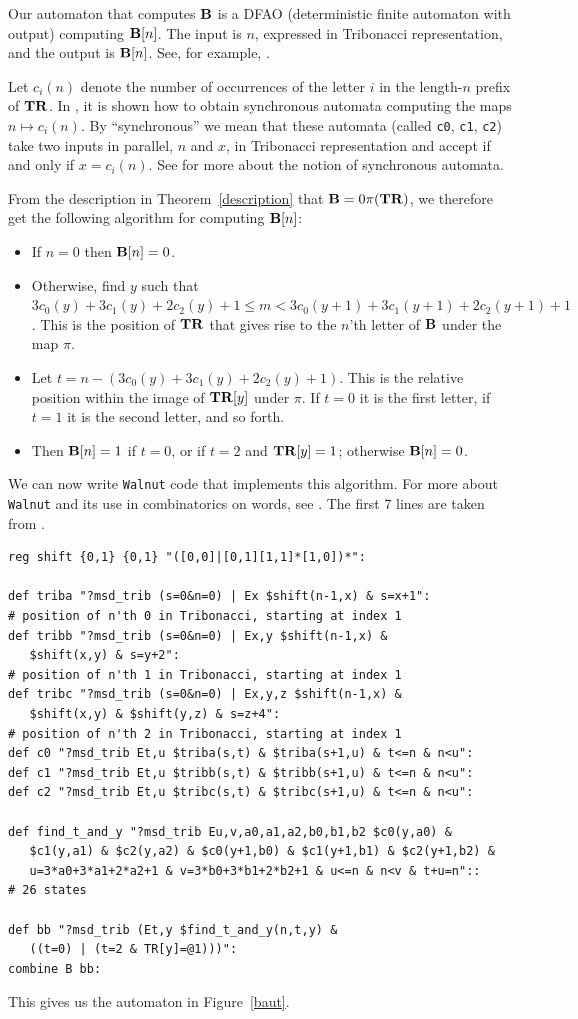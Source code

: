 \documentclass[
final
]{dmtcs-episciences}
\theoremstyle{plain}
\theoremstyle{definition}
\theoremstyle{remark}
\begin{document}
Our automaton that computes $\bf B$ is a DFAO (deterministic finite automaton
with output) computing ${\bf B}[n]$.  The input is $n$,
expressed in Tribonacci representation, and the output is
${\bf B}[n]$.  See, for example, \cite{Mousavi&Shallit:2015}.

Let $c_i (n)$ denote the number of occurrences of the letter $i$ in the length-$n$ prefix of $\bf TR$.  In
\cite[\S 10.12]{Shallit:2023},
it is shown how to obtain synchronous automata computing the maps
$n \mapsto c_i (n)$. By ``synchronous'' we mean  that these automata
(called {\tt c0}, {\tt c1}, {\tt c2}) take two inputs in parallel, $n$ and $x$, in Tribonacci representation and accept if and only if $x = c_i (n)$.  
See 
\cite{Shallit:2021} for more about the notion of synchronous automata.

From the description in Theorem~\ref{description} that ${\bf B} = 0 \pi({\bf TR})$, we therefore get the following algorithm for computing ${\bf B}[n]$:
\begin{itemize}
\item If $n=0$ then ${\bf B}[n]= 0$.
\item Otherwise, find $y$ such that $3c_0 (y) + 3 c_1(y) + 2c_2(y) + 1 \leq m < 3c_0 (y+1) + 3 c_1 (y+1) + 2c_2(y+1) + 1 $.  This is the position of $\bf TR$ that gives rise to the $n$'th letter of $\bf B$ under the map $\pi$.
\item Let $t = n - ( 3c_0 (y) + 3 c_1(y) + 2c_2(y) + 1)$.  This is the relative position within the image of ${\bf TR}[y]$ under $\pi$.  If $t = 0$ it is the first letter, if $t = 1$ it is the second letter, and so forth.
\item Then ${\bf B}[n] = 1$ if $t = 0$, or if $t=2$ and ${\bf TR}[y] = 1$; otherwise ${\bf B}[n] = 0$.
\end{itemize}

We can now write {\tt Walnut} code that implements this algorithm.  For more about {\tt Walnut} and its use in combinatorics on words, see
\cite{Shallit:2023}.  The first 7 lines are taken from \cite[\S 10.12]{Shallit:2023}.
\begin{verbatim}
reg shift {0,1} {0,1} "([0,0]|[0,1][1,1]*[1,0])*":

def triba "?msd_trib (s=0&n=0) | Ex $shift(n-1,x) & s=x+1":
# position of n'th 0 in Tribonacci, starting at index 1
def tribb "?msd_trib (s=0&n=0) | Ex,y $shift(n-1,x) & 
   $shift(x,y) & s=y+2":
# position of n'th 1 in Tribonacci, starting at index 1
def tribc "?msd_trib (s=0&n=0) | Ex,y,z $shift(n-1,x) &
   $shift(x,y) & $shift(y,z) & s=z+4":
# position of n'th 2 in Tribonacci, starting at index 1
def c0 "?msd_trib Et,u $triba(s,t) & $triba(s+1,u) & t<=n & n<u":
def c1 "?msd_trib Et,u $tribb(s,t) & $tribb(s+1,u) & t<=n & n<u":
def c2 "?msd_trib Et,u $tribc(s,t) & $tribc(s+1,u) & t<=n & n<u":

def find_t_and_y "?msd_trib Eu,v,a0,a1,a2,b0,b1,b2 $c0(y,a0) &
   $c1(y,a1) & $c2(y,a2) & $c0(y+1,b0) & $c1(y+1,b1) & $c2(y+1,b2) &
   u=3*a0+3*a1+2*a2+1 & v=3*b0+3*b1+2*b2+1 & u<=n & n<v & t+u=n"::
# 26 states

def bb "?msd_trib (Et,y $find_t_and_y(n,t,y) & 
   ((t=0) | (t=2 & TR[y]=@1)))":
combine B bb:
\end{verbatim}
This gives us the automaton in Figure~\ref{baut}.
\end{document}
